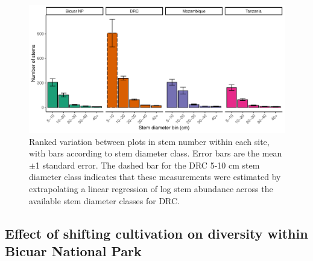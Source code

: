 \begin{refsection}
\begin{figure}
	\includegraphics[width=\linewidth]{img/stem_ab_dbh_bin_group}
	\caption[Bar plots of stem diameter abundance within each site]{Ranked variation between plots in stem number within each site, with bars according to stem diameter class. Error bars are the mean $\pm$1 standard error. The dashed bar for the DRC 5-10 cm stem diameter class indicates that these measurements were estimated by extrapolating a linear regression of log stem abundance across the available stem diameter classes for DRC.}
	\label{bicuar:stem_ab_dbh_bin}
\end{figure}

\subsection{Effect of shifting cultivation on diversity within Bicuar National Park}
\label{bicuar:ssec:disturbance}


\end{refsection}
